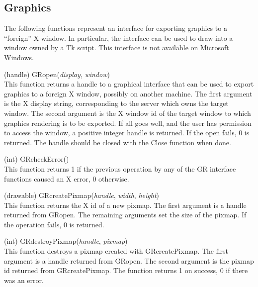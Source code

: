 \subsection{Graphics}

The following functions represent an interface for exporting graphics
to a ``foreign'' X window.  In particular, the interface can be used
to draw into a window owned by a {\et Tk} script.  This interface is
not available on Microsoft Windows.

\begin{description}
\item{(handle) \vt GRopen({\it display}, {\it window\/})}\\
This function returns a handle to a graphical interface that can be
used to export graphics to a foreign X window, possibly on another
machine.  The first argument is the X display string, corresponding to
the server which owns the target window.  The second argument is the X
window id of the target window to which graphics rendering is to be
exported.  If all goes well, and the user has permission to access the
window, a positive integer handle is returned.  If the open fails, 0
is returned.  The handle should be closed with the {\vt Close}
function when done.

\item{(int) \vt GRcheckError()}\\
This function returns 1 if the previous operation by any of the GR
interface functions caused an X error, 0 otherwise.

\item{(drawable) \vt GRcreatePixmap({\it handle}, {\it width},
  {\it height\/})}\\
This function returns the X id of a new pixmap.  The first argument is
a handle returned from {\vt GRopen}.  The remaining arguments set the
size of the pixmap.  If the operation fails, 0 is returned.

\item{(int) \vt GRdestroyPixmap({\it handle}, {\it pixmap\/})}\\
This function destroys a pixmap created with {\vt GRcreatePixmap}. 
The first argument is a handle returned from {\vt GRopen}.  The second
argument is the pixmap id returned from {\vt GRcreatePixmap}.  The
function returns 1 on success, 0 if there was an error.


\end{description}
